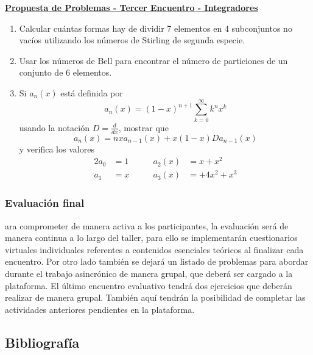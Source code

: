 \bigskip
\begin{center}
	\begin{minipage}{0.8\linewidth}
		\begin{center}
			\underline{\textbf{Propuesta de Problemas - Tercer Encuentro - Integradores}}
		\end{center}
		
		\begin{enumerate}
			\item Calcular cuántas formas hay de dividir 7 elementos en 4 subconjuntos no vacíos utilizando los números de Stirling de segunda especie.
			\item Usar los números de Bell para encontrar el número de particiones de un conjunto de 6 elementos.
			\item Si $a_n (x)$ está definida por $$a_n (x) = (1 - x)^{n+1} \sum_{k = 0}^{\infty} k^n x^k$$ usando la notación $D = \frac{d}{dx}$, mostrar que $$a_n (x) = n x a_{n-1} (x) + x (1 - x) D a_{n - 1} (x)$$ y verifica los valores \begin{alignat*}{2}
				a_0 &= 1 &\qquad a_2 (x) &= x + x^2\\
				a_1 &= x &\qquad a_3 (x) &= + 4x^2 + x^3
			\end{alignat*}
		\end{enumerate}
	\end{minipage}
\end{center}

\subsubsection{Evaluación final}

ara comprometer de manera activa a los participantes, la evaluación será de manera continua a lo largo del taller, para ello se implementarán cuestionarios virtuales individuales referentes a contenidos esenciales teóricos al finalizar cada encuentro. Por otro lado también se dejará un listado de problemas para abordar durante el trabajo asincrónico de manera grupal, que deberá ser cargado a la plataforma. El último encuentro evaluativo tendrá dos ejercicios que deberán realizar de manera grupal. También aquí tendrán la posibilidad de completar las actividades anteriores pendientes en la plataforma.

\subsection{Bibliografía}

\nocite{*}
\printbibliography[keyword={07}]